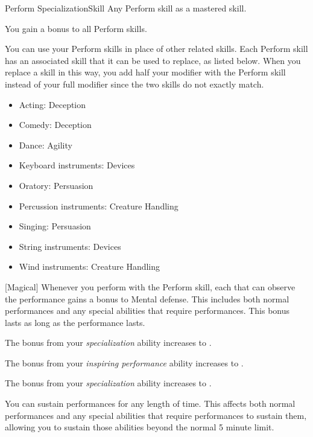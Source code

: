     \begin{feat}{Perform Specialization}{Skill}
        \featpre Any Perform skill as a mastered skill.

         You gain a  bonus to all Perform skills.

         You can use your Perform skills in place of other related skills.
        Each Perform skill has an associated skill that it can be used to replace, as listed below.
        When you replace a skill in this way, you add half your modifier with the Perform skill instead of your full modifier since the two skills do not exactly match.
        \begin{itemize}
            \item Acting: Deception
            \item Comedy: Deception
            \item Dance: Agility
            \item Keyboard instruments: Devices
            \item Oratory: Persuasion
            \item Percussion instruments: Creature Handling
            \item Singing: Persuasion
            \item String instruments: Devices
            \item Wind instruments: Creature Handling
        \end{itemize}

        [Magical] Whenever you perform with the Perform skill, each  that can observe the performance gains a  bonus to Mental defense.
        This includes both normal performances and any special abilities that require performances.
        This bonus lasts as long as the performance lasts.

         The bonus from your \textit{specialization} ability increases to .

         The bonus from your \textit{inspiring performance} ability increases to .

         The bonus from your \textit{specialization} ability increases to .

         You can sustain performances for any length of time.
        This affects both normal performances and any special abilities that require performances to sustain them, allowing you to sustain those abilities beyond the normal 5 minute limit.
    \end{feat}

